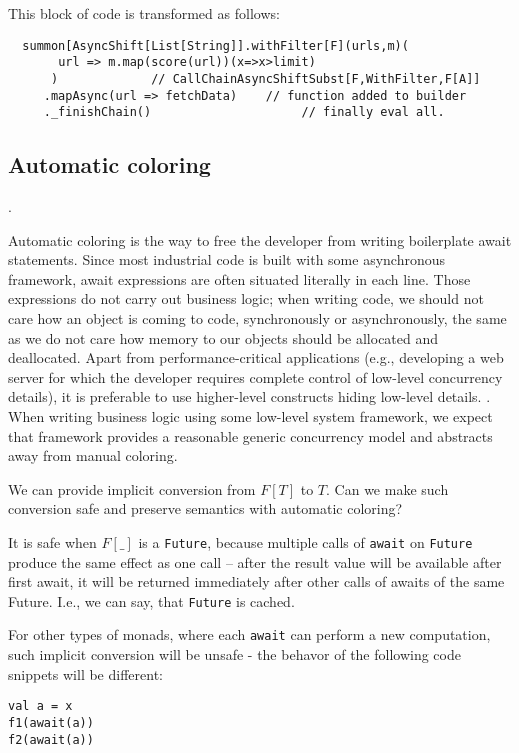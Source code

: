 \documentclass{llncs}
\begin{document}
This block of code is transformed as follows:

\begin{lstlisting}
  summon[AsyncShift[List[String]].withFilter[F](urls,m)(
       url => m.map(score(url))(x=>x>limit)
      )             // CallChainAsyncShiftSubst[F,WithFilter,F[A]]
     .mapAsync(url => fetchData)    // function added to builder
     ._finishChain()                     // finally eval all.
\end{lstlisting}

\subsection{ Automatic coloring }. 
\label{AutomaticColoring}

Automatic coloring is the way to free the developer from writing boilerplate await statements.  Since most industrial code is built with some asynchronous framework, await expressions are often situated literally in each line.  Those expressions do not carry out business logic; when writing code, we should not care how an object is coming to code, synchronously or asynchronously, the same as we do not care how memory to our objects should be allocated and deallocated. 
Apart from performance-critical applications (e.g., developing a web server for which the developer requires complete control of low-level concurrency details), it is preferable to use higher-level constructs hiding low-level details. 
. When writing business logic using some low-level system framework, we expect that framework provides a reasonable generic concurrency model and abstracts away from manual coloring.

 We can provide implicit conversion from $F[T]$ to $T$.  Can we make such conversion safe and preserve semantics with automatic coloring? 
 
 It is safe when $F[\_]$ is a \lstinline|Future|, because multiple calls of \lstinline|await| on \lstinline|Future| produce the same effect as one call -- after the result value will be available after first await, it will be returned immediately after other calls of awaits of the same Future.  I.e., we can say, that \lstinline|Future| is cached.    


    For other types of monads, where each \lstinline|await| can perform a new computation, such implicit conversion will be unsafe - the behavor of the following code snippets will be different: 
\begin{lstlisting}
val a = x
f1(await(a))
f2(await(a))
\end{lstlisting}    
\end{document}
